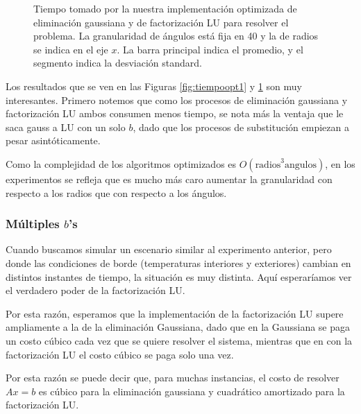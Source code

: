 \begin{figure}[H]
\begin{minipage}{0.48\textwidth}
  \caption{\footnotesize{Tiempo tomado por la nuestra implementación optimizada de eliminación gaussiana y de factorización LU para resolver el problema. La granularidad de ángulos está fija en 40 y la de radios se indica en el eje $x$. La barra principal indica el promedio, y el segmento indica la desviación standard.}}
  \label{fig:tiempoopt2}
\end{minipage}
\end{figure}


Los resultados que se ven en las Figuras \ref{fig:tiempoopt1} y \ref{fig:tiempoopt2} son muy interesantes. Primero notemos que como los procesos de eliminación gaussiana y factorización LU ambos consumen menos tiempo, se nota más la ventaja que le saca gauss a LU con un solo $b$, dado que los procesos de substitución empiezan a pesar asintóticamente.


Como la complejidad de los algoritmos optimizados es $O(\text{radios}^3   \text{angulos})$, en los experimentos se refleja que es mucho más caro aumentar la granularidad con respecto a los radios que con respecto a los ángulos.

\subsubsection{Múltiples $b$'s}

Cuando buscamos simular un escenario similar al experimento anterior, pero donde las condiciones de borde (temperaturas interiores y exteriores) cambian en distintos instantes de tiempo, la situación es muy distinta. Aquí esperaríamos ver el verdadero poder de la factorización LU.

Por esta razón, esperamos que la implementación de la factorización LU supere ampliamente a la de la eliminación Gaussiana, dado que en la Gaussiana se paga un costo cúbico cada vez que se quiere resolver el sistema, mientras que en con la factorización LU el costo cúbico se paga solo una vez.

Por esta razón se puede decir que, para muchas instancias, el costo de resolver $Ax = b$ es cúbico para la eliminación gaussiana y cuadrático amortizado para la factorización LU.

